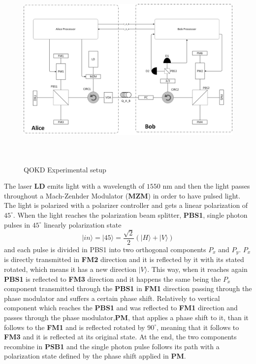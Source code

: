 \begin{figure}[hbt]
	\centering \includegraphics[width=1.1\textwidth,height=10cm]{./sdf/qokd_with_discrete_variables/figures/Experimental_setup.png}
	\caption{QOKD Experimental setup}\label{experimental_setup}
\end{figure}

The laser \textbf{LD} emits light with a wavelength of $1550$ nm and then the light passes throughout a Mach-Zenhder Modulator (\textbf{MZM}) in order to have pulsed light. The light is polarized with a polarizer controller and gets a linear polarization of $45^{\circ}$. When the light reaches the polarization beam splitter, \textbf{PBS1}, single photon pulses in $45^{\circ}$ linearly polarization state $$|in\rangle=|45\rangle=\frac{\sqrt{2}}{2}(|H\rangle+|V\rangle)$$ and each pulse is divided in PBS1 into two orthogonal components $P_x$ and $P_y$. $P_x$ is directly transmitted in \textbf{FM2} direction and it is reflected by it with its stated rotated, which means it has a new direction $|V\rangle$. This way, when it reaches again \textbf{PBS1} is reflected to \textbf{FM3} direction and it happens the same being the $P_x$ component transmitted through the \textbf{PBS1} in \textbf{FM1} direction passing through the phase modulator and suffers a certain phase shift. Relatively to vertical component which reaches the \textbf{PBS1} and was reflected to \textbf{FM1} direction and passes through the phase modulator,\textbf{PM}, that applies a phase shift to it, than it follows to the \textbf{FM1} and is reflected rotated by $90^{\circ}$, meaning that it follows to \textbf{FM3} and it is reflected at its original state. At the end, the two components recombine in \textbf{PSB1} and the single photon pulse follows its path with a polarization state defined by the phase shift applied in \textbf{PM}.

